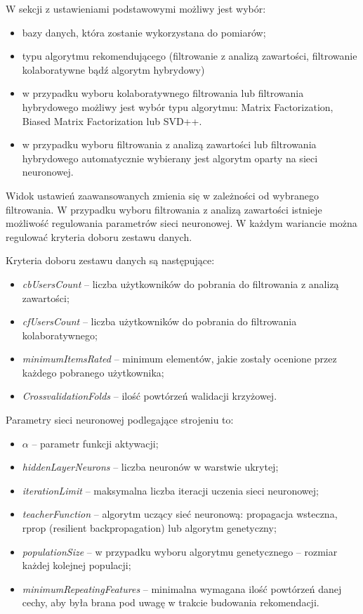 \documentclass[twoside]{iisthesis}
\begin{document}
		W sekcji z ustawieniami podstawowymi możliwy jest wybór:
		\begin{itemize}
			\item bazy danych, która zostanie wykorzystana do pomiarów;
			\item typu algorytmu rekomendującego (filtrowanie z analizą zawartości, filtrowanie kolaboratywne bądź algorytm hybrydowy)
			\item w przypadku wyboru kolaboratywnego filtrowania lub filtrowania hybrydowego możliwy jest wybór typu algorytmu: Matrix Factorization, Biased Matrix Factorization lub SVD++.
			\item w przypadku wyboru filtrowania z analizą zawartości lub filtrowania hybrydowego automatycznie wybierany jest algorytm oparty na sieci neuronowej. 
		\end{itemize}
		 
		 Widok ustawień zaawansowanych zmienia się w zależności od wybranego filtrowania. W przypadku wyboru filtrowania z analizą zawartości istnieje możliwość regulowania parametrów sieci neuronowej. W każdym wariancie można regulować kryteria doboru zestawu danych.
		 
		 Kryteria doboru zestawu danych są następujące:
		 
		 \begin{itemize}
		 	\item \textit{cbUsersCount} -- liczba użytkowników do pobrania do filtrowania z analizą zawartości;
		 	\item \textit{cfUsersCount} -- liczba użytkowników do pobrania do filtrowania kolaboratywnego;
		 	\item \textit{minimumItemsRated} -- minimum elementów, jakie zostały ocenione przez każdego pobranego użytkownika;
		 	\item \textit{CrossvalidationFolds} -- ilość powtórzeń walidacji krzyżowej.
		 \end{itemize}
		 
		 Parametry sieci neuronowej podlegające strojeniu to:

		 \begin{itemize}
		 	\item $\alpha$ -- parametr funkcji aktywacji;
		 	\item \textit{hiddenLayerNeurons} -- liczba neuronów w warstwie ukrytej;
		 	\item \textit{iterationLimit} -- maksymalna liczba iteracji uczenia sieci neuronowej;
		 	\item \textit{teacherFunction} -- algorytm uczący sieć neuronową: propagacja wsteczna, rprop (resilient backpropagation) lub algorytm genetyczny;
		 	\item \textit{populationSize} -- w przypadku wyboru algorytmu genetycznego -- rozmiar każdej kolejnej populacji;
		 	\item \textit{minimumRepeatingFeatures} -- minimalna wymagana ilość powtórzeń danej cechy, aby była brana pod uwagę w trakcie budowania rekomendacji.
		 \end{itemize}	 
		
\end{document}
